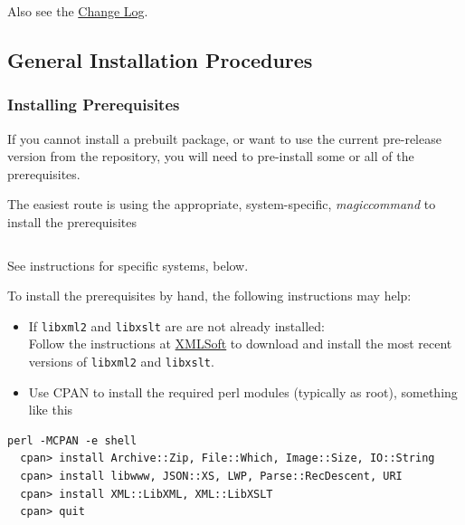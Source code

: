 \documentclass{article}
\begin{document}
Also see the \href{Changes}{Change Log}.

\subsection{General Installation Procedures}\label{install.general}
\subsubsection{Installing Prerequisites}\label{install.prerequisites}
If you cannot install a prebuilt package, or want to use the current
pre-release version from the repository, you will need to pre-install some or
all of the prerequisites.

The easiest route is using the appropriate, system-specific,
\textit{magiccommand} to install the prerequisites
\begin{lstlisting}[style=shell]
%magiccommand% %prerequisite% ...
\end{lstlisting}
See instructions for specific systems, below.

To install the prerequisites by hand, the following instructions may help:
\begin{itemize}
\item If \texttt{libxml2} and \texttt{libxslt} are are not already installed:\\
  Follow the instructions at \href{http://www.xmlsoft.org}{XMLSoft} to
  download and install the most recent versions of \texttt{libxml2} and \texttt{libxslt}.
\item Use CPAN to install the required perl modules (typically as root), something like this
\end{itemize}
\begin{lstlisting}[style=shell]
perl -MCPAN -e shell
  cpan> install Archive::Zip, File::Which, Image::Size, IO::String
  cpan> install libwww, JSON::XS, LWP, Parse::RecDescent, URI
  cpan> install XML::LibXML, XML::LibXSLT
  cpan> quit
\end{lstlisting}
\end{document}
